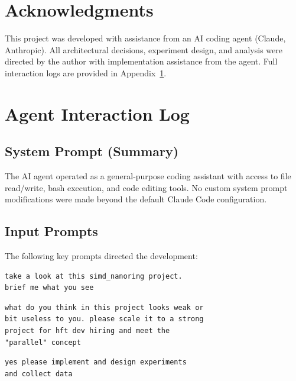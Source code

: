 \documentclass[conference]{IEEEtran}
\begin{document}
\section*{Acknowledgments}

This project was developed with assistance from an AI coding agent (Claude, Anthropic). All architectural decisions, experiment design, and analysis were directed by the author with implementation assistance from the agent. Full interaction logs are provided in Appendix~\ref{sec:appendix-agent}.

\appendix

\section{Agent Interaction Log}
\label{sec:appendix-agent}

\subsection{System Prompt (Summary)}

The AI agent operated as a general-purpose coding assistant with access to file read/write, bash execution, and code editing tools. No custom system prompt modifications were made beyond the default Claude Code configuration.

\subsection{Input Prompts}

The following key prompts directed the development:

\begin{lstlisting}[style=promptstyle, caption={Initial analysis request}]
take a look at this simd_nanoring project.
brief me what you see
\end{lstlisting}

\begin{lstlisting}[style=promptstyle, caption={Design critique and scaling request}]
what do you think in this project looks weak or
bit useless to you. please scale it to a strong
project for hft dev hiring and meet the
"parallel" concept
\end{lstlisting}

\begin{lstlisting}[style=promptstyle, caption={Implementation directive}]
yes please implement and design experiments
and collect data
\end{lstlisting}
\end{document}
